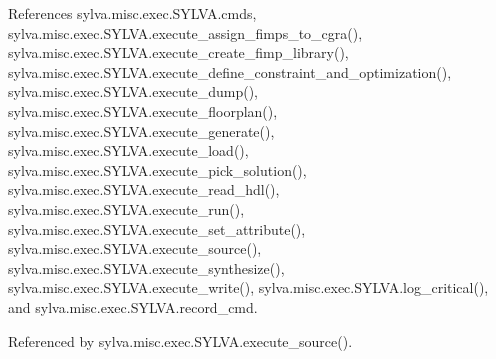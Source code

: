 References sylva.\+misc.\+exec.\+S\+Y\+L\+V\+A.\+cmds, sylva.\+misc.\+exec.\+S\+Y\+L\+V\+A.\+execute\+\_\+assign\+\_\+fimps\+\_\+to\+\_\+cgra(), sylva.\+misc.\+exec.\+S\+Y\+L\+V\+A.\+execute\+\_\+create\+\_\+fimp\+\_\+library(), sylva.\+misc.\+exec.\+S\+Y\+L\+V\+A.\+execute\+\_\+define\+\_\+constraint\+\_\+and\+\_\+optimization(), sylva.\+misc.\+exec.\+S\+Y\+L\+V\+A.\+execute\+\_\+dump(), sylva.\+misc.\+exec.\+S\+Y\+L\+V\+A.\+execute\+\_\+floorplan(), sylva.\+misc.\+exec.\+S\+Y\+L\+V\+A.\+execute\+\_\+generate(), sylva.\+misc.\+exec.\+S\+Y\+L\+V\+A.\+execute\+\_\+load(), sylva.\+misc.\+exec.\+S\+Y\+L\+V\+A.\+execute\+\_\+pick\+\_\+solution(), sylva.\+misc.\+exec.\+S\+Y\+L\+V\+A.\+execute\+\_\+read\+\_\+hdl(), sylva.\+misc.\+exec.\+S\+Y\+L\+V\+A.\+execute\+\_\+run(), sylva.\+misc.\+exec.\+S\+Y\+L\+V\+A.\+execute\+\_\+set\+\_\+attribute(), sylva.\+misc.\+exec.\+S\+Y\+L\+V\+A.\+execute\+\_\+source(), sylva.\+misc.\+exec.\+S\+Y\+L\+V\+A.\+execute\+\_\+synthesize(), sylva.\+misc.\+exec.\+S\+Y\+L\+V\+A.\+execute\+\_\+write(), sylva.\+misc.\+exec.\+S\+Y\+L\+V\+A.\+log\+\_\+critical(), and sylva.\+misc.\+exec.\+S\+Y\+L\+V\+A.\+record\+\_\+cmd.



Referenced by sylva.\+misc.\+exec.\+S\+Y\+L\+V\+A.\+execute\+\_\+source().


